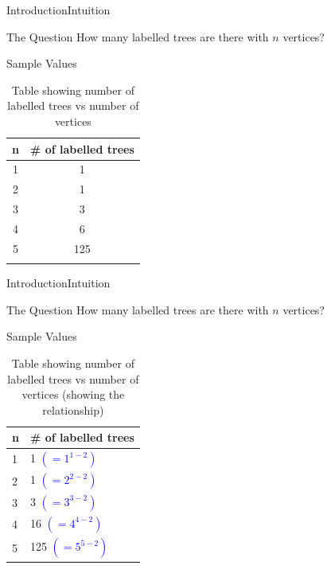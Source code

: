 \documentclass[10pt]{beamer}
\theoremstyle{definition}
\newcommand{\Sone}{Introduction}
\newcommand{\SoneSSintuition}{Intuition}
\begin{document}
\begin{frame}{\Sone}{\SoneSSintuition}
\begin{block}{The Question}
How many labelled trees are there with $n$ vertices?
\end{block}

\pause{}

\begin{block}{Sample Values}
\begin{table}[ht]
\centering
\begin{tabular}[t]{cc}
\toprule
n&\# of labelled trees\\
\midrule
1&1   \\
2&1   \\
3&3   \\
4&6   \\
5&125 \\
\bottomrule
\label{tab:values}
\end{tabular}
\caption{Table showing number of labelled trees vs number of vertices}
\end{table}
\end{block}

\end{frame}

\begin{frame}{\Sone}{\SoneSSintuition}
\begin{block}{The Question}
How many labelled trees are there with $n$ vertices?
\end{block}

\begin{block}{Sample Values}
\begin{table}[]
\centering
\begin{tabular}{ll}
\toprule
n & \# of labelled trees                   \\
\midrule
1 & 1   \textcolor{blue}{$(= 1^{1-2})$}    \\
2 & 1   \textcolor{blue}{$(= 2^{2-2})$}    \\
3 & 3   \textcolor{blue}{$(= 3^{3-2})$}    \\
4 & 16  \textcolor{blue}{$(= 4^{4-2})$}    \\
5 & 125 \textcolor{blue}{$(= 5^{5-2})$}    \\
\bottomrule
\end{tabular}
\caption{Table showing number of labelled trees vs number of vertices (showing the relationship)}
\label{tab:values-relationship}
\end{table}
\end{block}

\end{frame}
\end{document}
